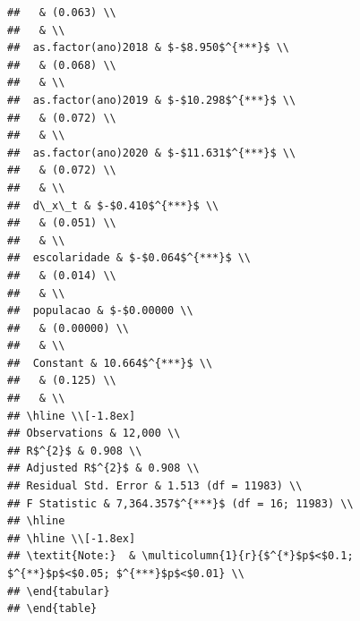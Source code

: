 \documentclass[
]{article}
\begin{document}
\begin{verbatim}
##   & (0.063) \\ 
##   & \\ 
##  as.factor(ano)2018 & $-$8.950$^{***}$ \\ 
##   & (0.068) \\ 
##   & \\ 
##  as.factor(ano)2019 & $-$10.298$^{***}$ \\ 
##   & (0.072) \\ 
##   & \\ 
##  as.factor(ano)2020 & $-$11.631$^{***}$ \\ 
##   & (0.072) \\ 
##   & \\ 
##  d\_x\_t & $-$0.410$^{***}$ \\ 
##   & (0.051) \\ 
##   & \\ 
##  escolaridade & $-$0.064$^{***}$ \\ 
##   & (0.014) \\ 
##   & \\ 
##  populacao & $-$0.00000 \\ 
##   & (0.00000) \\ 
##   & \\ 
##  Constant & 10.664$^{***}$ \\ 
##   & (0.125) \\ 
##   & \\ 
## \hline \\[-1.8ex] 
## Observations & 12,000 \\ 
## R$^{2}$ & 0.908 \\ 
## Adjusted R$^{2}$ & 0.908 \\ 
## Residual Std. Error & 1.513 (df = 11983) \\ 
## F Statistic & 7,364.357$^{***}$ (df = 16; 11983) \\ 
## \hline 
## \hline \\[-1.8ex] 
## \textit{Note:}  & \multicolumn{1}{r}{$^{*}$p$<$0.1; $^{**}$p$<$0.05; $^{***}$p$<$0.01} \\ 
## \end{tabular} 
## \end{table}
\end{verbatim}
\end{document}
